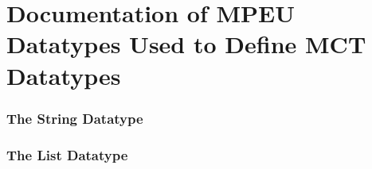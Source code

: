 \documentclass{article}
\begin{document}
\part{Documentation of MPEU Datatypes Used to Define MCT Datatypes}
%
\section{The String Datatype} 

\vspace*{\fill}
\newpage
%
\section{The List Datatype}

\vspace*{\fill}
\newpage


 
%
\end{document}

